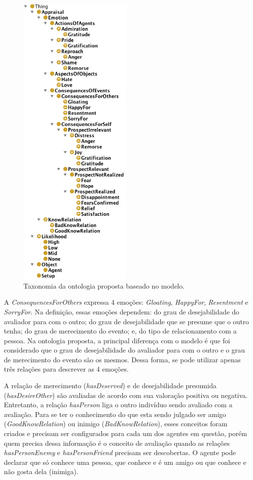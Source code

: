 \begin{figure}
  \includegraphics[height=149mm]{figuras/hierarquiaLOCC.png}
  \caption{Taxonomia da ontologia proposta baseado no modelo.}
  \label{fig:tlocc}
\end{figure}

A \emph{ConsequencesForOthers} expressa 4 emoções: \emph{Gloating},
\emph{HappyFor}, \emph{Resentment} e \emph{SorryFor}. Na definição, essas
emoções dependem: do grau de desejabilidade do avaliador para com o outro; do
grau de desejabilidade que se presume que o outro tenha; do grau de
merecimento do evento; e, do tipo de relacionamento com a pessoa. Na ontologia
proposta, a principal diferença com o modelo \occ é que foi considerado
que o grau de desejabilidade do avaliador para com o outro e o grau de
merecimento do evento são os mesmos. Dessa forma, se pode utilizar apenas três
relações para descrever as 4 emoções.

A relação de merecimento (\emph{hasDeserved}) e de desejabilidade
presumida (\emph{hasDesireOther}) são avaliadas de acordo com sua valoração
positiva ou negativa. Entretanto, a relação \emph{hasPerson} liga o outro indivíduo
sendo avaliado com a avaliação. Para se ter o conhecimento do que esta sendo julgado
ser amigo (\emph{GoodKnowRelation}) ou inimigo (\emph{BadKnowRelation}), esses
conceitos foram criados e precisam ser configurados para cada um dos agentes
em questão, porém quem precisa dessa informação é o conceito de avaliação
quando as relações \emph{hasPersonEnemy} e \emph{hasPersonFriend} precisam ser
descobertas. O agente pode declarar que só conhece uma pessoa, que conhece e é
um amigo ou que conhece e não gosta dela (inimiga).

